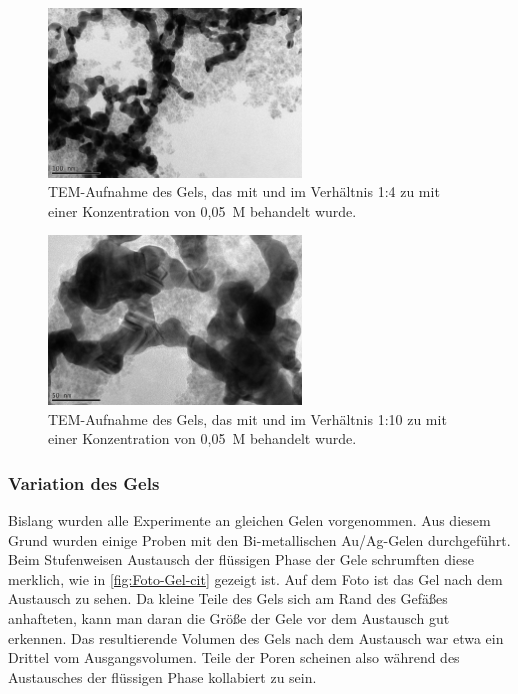 		\begin{figure}[H]
			\centering
			\includegraphics[width=0.6\textwidth]{Bilder/Gel-E-CdCl-1-4-0,05} 	
			\caption{TEM-Aufnahme des Gels, das mit  und  im Verhältnis 1:4  zu  mit einer Konzentration von 0,05~M behandelt wurde.}
			\label{fig:Gel-E-CdCl-1-4-0,05}
		\end{figure}
	
		\begin{figure}[H]
			\centering
			\includegraphics[width=0.6\textwidth]{Bilder/Gel-E-CdCl-1-10-0,05} 	
			\caption{TEM-Aufnahme des Gels, das mit  und  im Verhältnis 1:10  zu  mit einer Konzentration von 0,05~M behandelt wurde.}
			\label{fig:Gel-E-CdCl-1-10-0,05}
		\end{figure}
		
	\subsubsection{Variation des Gels}
		Bislang wurden alle Experimente an gleichen Gelen vorgenommen.
		Aus diesem Grund wurden einige Proben mit den Bi-metallischen Au/Ag-Gelen durchgeführt.
		Beim Stufenweisen Austausch der flüssigen Phase der Gele schrumften diese merklich, wie in \cref{fig:Foto-Gel-cit} gezeigt ist.
		Auf dem Foto ist das Gel nach dem Austausch zu sehen. 
		Da kleine Teile des Gels sich am Rand des Gefäßes anhafteten,  kann man daran die Größe der Gele vor dem Austausch gut erkennen. 
		Das resultierende Volumen des Gels nach dem Austausch war etwa ein Drittel vom Ausgangsvolumen.
		Teile der Poren scheinen also während des Austausches der flüssigen Phase kollabiert zu sein.
		
